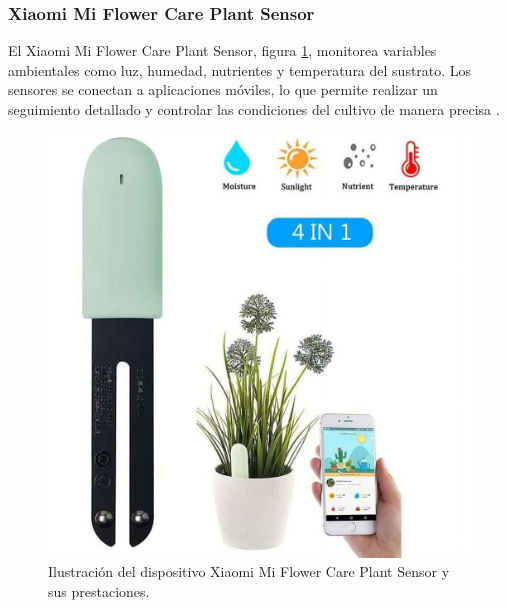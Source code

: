 \subsubsection{Xiaomi Mi Flower Care Plant Sensor}
El Xiaomi Mi Flower Care Plant Sensor, figura \ref{fig:xiaomi}, monitorea variables ambientales como luz, humedad, nutrientes y temperatura del sustrato. Los sensores se conectan a aplicaciones móviles, lo que permite realizar un seguimiento detallado y controlar las condiciones del cultivo de manera precisa \cite{XIAOMI}.

\begin{figure}[H]
	\centering
	\includegraphics[scale=.15]{./Figures/xiaomi.jpeg}
	\caption{Ilustración del dispositivo Xiaomi Mi Flower Care Plant Sensor y sus prestaciones\protect\footnotemark.}
	\label{fig:xiaomi}
\end{figure}





